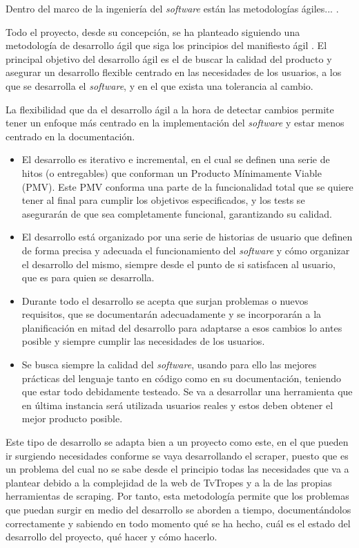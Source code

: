 Dentro del marco de la ingeniería del \textit{software} están las metodologías
ágiles... \cite{abrahamsson2017agile}.

Todo el proyecto, desde su concepción, se ha planteado siguiendo una metodología
de desarrollo ágil que siga los principios del manifiesto ágil
\cite{agilemanifesto}. El principal objetivo del desarrollo ágil es el de buscar
la calidad del producto y asegurar un desarrollo flexible centrado en las
necesidades de los usuarios, a los que se desarrolla el \textit{software}, y en
el que exista una tolerancia al cambio.

La flexibilidad que da el desarrollo ágil a la hora de detectar cambios permite
tener un enfoque más centrado en la implementación del \textit{software} y estar
menos centrado en la documentación.

\begin{itemize}
    \item El desarrollo es iterativo e incremental, en el cual se definen una
    serie de hitos (o entregables) que conforman un Producto Mínimamente Viable
    (PMV). Este PMV conforma una parte de la funcionalidad total que se quiere
    tener al final para cumplir los objetivos especificados, y los tests se
    asegurarán de que sea completamente funcional, garantizando su calidad.
    \item El desarrollo está organizado por una serie de historias de usuario
    que definen de forma precisa y adecuada el funcionamiento del
    \textit{software} y cómo organizar el desarrollo del mismo, siempre desde el
    punto de si satisfacen al usuario, que es para quien se desarrolla.
    \item Durante todo el desarrollo se acepta que surjan problemas o nuevos
    requisitos, que se documentarán adecuadamente y se incorporarán a la
    planificación en mitad del desarrollo para adaptarse a esos cambios lo antes
    posible y siempre cumplir las necesidades de los usuarios.
    \item Se busca siempre la calidad del \textit{software}, usando para ello
    las mejores prácticas del lenguaje tanto en código como en su documentación,
    teniendo que estar todo debidamente testeado. Se va a desarrollar una
    herramienta que en última instancia será utilizada usuarios reales y estos
    deben obtener el mejor producto posible.
\end{itemize}

Este tipo de desarrollo se adapta bien a un proyecto como este, en el que pueden
ir surgiendo necesidades conforme se vaya desarrollando el scraper, puesto que
es un problema del cual no se sabe desde el principio todas las necesidades que
va a plantear debido a la complejidad de la web de TvTropes y a la de las
propias herramientas de scraping. Por tanto, esta metodología permite que los
problemas que puedan surgir en medio del desarrollo se aborden a tiempo,
documentándolos correctamente y sabiendo en todo momento qué se ha hecho, cuál
es el estado del desarrollo del proyecto, qué hacer y cómo hacerlo.


